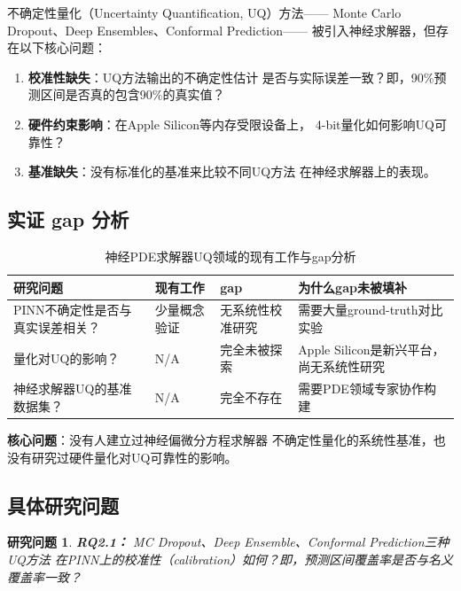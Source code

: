 \documentclass[12pt,a4paper,twoside]{article}
\newtheorem{researchq}{研究问题}[section]
\begin{document}
\begin{inversation}
不确定性量化（Uncertainty Quantification, UQ）方法——
Monte Carlo Dropout、Deep Ensembles、Conformal Prediction——
被引入神经求解器，但存在以下核心问题：

\begin{enumerate}
    \item \textbf{校准性缺失}：UQ方法输出的不确定性估计
        是否与实际误差一致？即，90\%预测区间是否真的包含90\%的真实值？
    \item \textbf{硬件约束影响}：在Apple Silicon等内存受限设备上，
        4-bit量化如何影响UQ可靠性？
    \item \textbf{基准缺失}：没有标准化的基准来比较不同UQ方法
        在神经求解器上的表现。
\end{enumerate}

\subsection{实证 gap 分析}

\begin{table}[h]
    \centering
    \caption{神经PDE求解器UQ领域的现有工作与gap分析}
    \begin{tabular}{p{3cm}p{3cm}p{4cm}p{4cm}}
        \toprule
        \textbf{研究问题} & \textbf{现有工作} & \textbf{gap} & \textbf{为什么gap未被填补} \\
        \midrule
        PINN不确定性是否与真实误差相关？ & 少量概念验证 & 无系统性校准研究 & 需要大量ground-truth对比实验 \\
        量化对UQ的影响？ & N/A & 完全未被探索 & Apple Silicon是新兴平台，尚无系统性研究 \\
        神经求解器UQ的基准数据集？ & N/A & 完全不存在 & 需要PDE领域专家协作构建 \\
        \bottomrule
    \end{tabular}
\end{table}

\textbf{核心问题}：没有人建立过神经偏微分方程求解器
不确定性量化的系统性基准，也没有研究过硬件量化对UQ可靠性的影响。

\subsection{具体研究问题}

\begin{researchq}
\textbf{RQ2.1：} MC Dropout、Deep Ensemble、Conformal Prediction三种UQ方法
在PINN上的校准性（calibration）如何？即，预测区间覆盖率是否与名义覆盖率一致？
\end{researchq}


\end{inversation}
\end{document}
